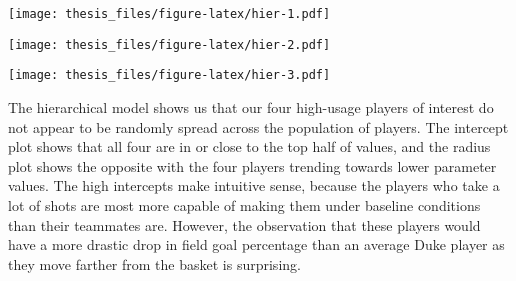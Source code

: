 \documentclass[12pt,twoside]{dukestatscithesis}
\theoremstyle{definition}
\theoremstyle{definition}
\theoremstyle{definition}
\theoremstyle{remark}
\begin{document}
\texttt{[image: thesis\_files/figure-latex/hier-1.pdf]}
\begin{Shaded}
\begin{Highlighting}[]
\NormalTok{(}\NormalTok{(hier[[}\NormalTok{]]), mainlab, }\NormalTok{)}
\NormalTok{(}\NormalTok{fourparams[,}\NormalTok{], }\NormalTok{)}
\end{Highlighting}
\end{Shaded}
\texttt{[image: thesis\_files/figure-latex/hier-2.pdf]}
\begin{Shaded}
\begin{Highlighting}[]
\NormalTok{(}\NormalTok{(hier[[}\NormalTok{]]),mainlab, }\NormalTok{)}
\NormalTok{(}\NormalTok{fourparams[,}\NormalTok{], }\NormalTok{)}
\end{Highlighting}
\end{Shaded}
\texttt{[image: thesis\_files/figure-latex/hier-3.pdf]}

The hierarchical model shows us that our four high-usage players of
interest do not appear to be randomly spread across the population of
players. The intercept plot shows that all four are in or close to the
top half of values, and the radius plot shows the opposite with the four
players trending towards lower parameter values. The high intercepts
make intuitive sense, because the players who take a lot of shots are
most more capable of making them under baseline conditions than their
teammates are. However, the observation that these players would have a
more drastic drop in field goal percentage than an average Duke player
as they move farther from the basket is surprising.
\end{document}
